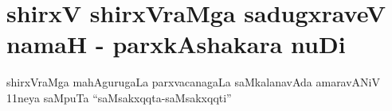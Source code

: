 \chapter*{shirxV shirxVraMga sadugxraveV namaH - parxkAshakara nuDi}

shirxVraMga mahAgurugaLa parxvacanagaLa saMkalanavAda amaravANiV 11neya saMpuTa ``saMsakxqqta-saMsakxqqti''
